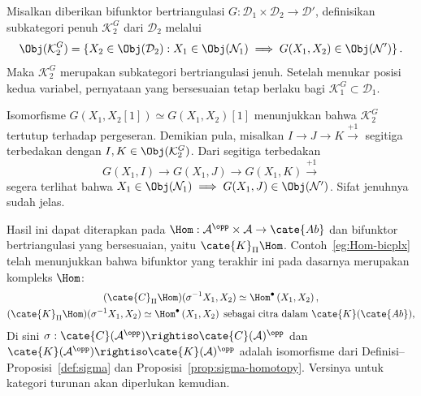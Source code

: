 \begin{lema}\label{prop:K-cats}
	Misalkan diberikan bifunktor bertriangulasi
	$G:\mathcal{D}_1\times\mathcal{D}_2\to\mathcal{D}'$, definisikan
	subkategori penuh $\mathcal{K}_2^G$ dari $\mathcal{D}_2$ melalui
	\[ \Obj(\mathcal{K}_2^G) = \left\{ X_2 \in \Obj(\mathcal{D}_2) : X_1 \in \Obj(\mathcal{N}_1) \implies G(X_1, X_2) \in \Obj(\mathcal{N}') \right\}. \]
	Maka $\mathcal{K}_2^G$ merupakan subkategori bertriangulasi jenuh. Setelah
	menukar posisi kedua variabel, pernyataan yang bersesuaian tetap berlaku bagi
	$\mathcal{K}_1^G\subset\mathcal{D}_1$.
\end{lema}
\begin{bukti}
	Isomorfisme $G(X_1,X_2[1])\simeq G(X_1,X_2)[1]$ menunjukkan bahwa
	$\mathcal{K}_2^G$ tertutup terhadap pergeseran. Demikian pula, misalkan
	$I\to J\to K\xrightarrow{+1}$ segitiga terbedakan dengan
	$I,K\in\Obj(\mathcal{K}_2^G)$. Dari segitiga terbedakan
	\[ G(X_1, I) \to G(X_1, J) \to G(X_1, K) \xrightarrow{+1} \]
	segera terlihat bahwa
	$X_1\in\Obj(\mathcal{N}_1)\implies
	G(X_1,J)\in\Obj(\mathcal{N}')$. Sifat jenuhnya sudah jelas.
\end{bukti}

Hasil ini dapat diterapkan pada
$\Hom:\mathcal{A}^{\opp}\times\mathcal{A}\to\cate{Ab}$ dan bifunktor
bertriangulasi yang bersesuaian, yaitu $\cate{K}_{\Pi}\Hom$.
Contoh~\ref{eg:Hom-bicplx} telah menunjukkan bahwa bifunktor yang terakhir ini
pada dasarnya merupakan kompleks $\Hom$:
\begin{equation}\label{eqn:CPiHom}\begin{gathered}
	(\cate{C}_{\Pi} \Hom)(\sigma^{-1} X_1, X_2) \simeq \Hom^\bullet\left( X_1, X_2 \right), \\
	(\cate{K}_\Pi \Hom)(\sigma^{-1} X_1, X_2) \simeq \Hom^\bullet\left( X_1, X_2 \right)\; \text{sebagai citra dalam $\cate{K}(\cate{Ab})$},
\end{gathered}\end{equation}
Di sini
$\sigma:\cate{C}(\mathcal{A}^{\opp})\rightiso
\cate{C}(\mathcal{A})^{\opp}$ dan
$\cate{K}(\mathcal{A}^{\opp})\rightiso\cate{K}(\mathcal{A})^{\opp}$
adalah isomorfisme dari Definisi--Proposisi~\ref{def:sigma} dan
Proposisi~\ref{prop:sigma-homotopy}. Versinya untuk kategori turunan akan
diperlukan kemudian.

